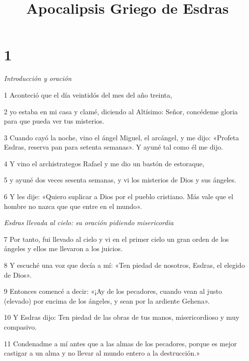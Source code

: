 

\title{Apocalipsis Griego de Esdras}

\chapter{1}

\par \textit{Introducción y oración}

\par 1 Aconteció que el día veintidós del mes del año treinta, 

\par 2 yo estaba en mi casa y clamé, diciendo al Altísimo: Señor, concédeme gloria para que pueda ver tus misterios.


\par 3 Cuando cayó la noche, vino el ángel Miguel, el arcángel, y me dijo: «Profeta Esdras, reserva pan para setenta semanas». Y ayuné tal como él me dijo.

\par 4 Y vino el archistrategos Rafael y me dio un bastón de estoraque, 

\par 5 y ayuné dos veces sesenta semanas, y vi los misterios de Dios y sus ángeles.

\par 6 Y les dije: «Quiero suplicar a Dios por el pueblo cristiano. Más vale que el hombre no nazca que que entre en el mundo».

\par \textit{Esdras llevada al cielo: su oración pidiendo misericordia}

\par 7 Por tanto, fui llevado al cielo y vi en el primer cielo un gran orden de los ángeles y ellos me llevaron a los juicios.

\par 8 Y escuché una voz que decía a mí: «Ten piedad de nosotros, Esdras, el elegido de Dios».

\par 9 Entonces comencé a decir: «¡Ay de los pecadores, cuando vean al justo (elevado) por encima de los ángeles, y sean por la ardiente Gehena».

\par 10 Y Esdras dijo: Ten piedad de las obras de tus manos, misericordioso y muy compasivo.

\par 11 Condenadme a mí antes que a las almas de los pecadores, porque es mejor castigar a un alma y no llevar al mundo entero a la destrucción.»


